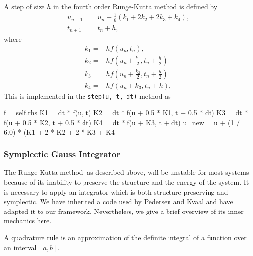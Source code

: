     A step of size $h$ in the fourth order Runge-Kutta method is defined by 
    \begin{equation}
       \begin{aligned}
            u_{n+1} =& u_n + \frac{1}{6}(k_1 + 2k_2 + 2k_3 + k_4), \\
            t_{n+1} =& t_n + h,
       \end{aligned} 
    \end{equation} 
    where
    \begin{align*}
        k_1 =& hf(u_n, t_n), \\
        k_2 =& hf(u_n + \frac{k_1}{2}, t_n + \frac{h}{2}), \\
        k_3 =& hf(u_n + \frac{k_2}{2}, t_n + \frac{h}{2}), \\
        k_4 =& hf(u_n + k_3, t_n + h),
    \end{align*}
    This is implemented in the \lstinline{step(u, t, dt)} method as
    \begin{python}
    f = self.rhs
    K1 = dt * f(u, t)
    K2 = dt * f(u + 0.5 * K1, t + 0.5 * dt)
    K3 = dt * f(u + 0.5 * K2, t + 0.5 * dt)
    K4 = dt * f(u + K3, t + dt)
    u_new = u + (1 / 6.0) * (K1 + 2 * K2 + 2 * K3 + K4 
    \end{python}

    \subsubsection{Symplectic Gauss Integrator}

    \begin{figure}
    
    \end{figure}

    The Runge-Kutta method, as described above, will be unstable for most systems
    because of its inability to preserve the structure and the energy of the system.
    It is 
    necessary to apply an integrator which is both structure-preserving and 
    symplectic.
    We have inherited a code used by 
    Pedersen and Kvaal \cite{pedersen2019symplectic} and have 
    adapted it to our framework. Nevertheless, we give a brief overview of 
    its inner mechanics here.

    A quadrature rule is an approximation of the definite integral of a function over 
    an interval $[a,b]$.

